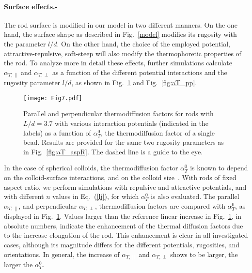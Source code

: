 \documentclass[aps,pre,twocolumn,showpacs,superscriptaddress]{revtex4-1}
\begin{document}
\paragraph{Surface  effects.-}
The rod surface is modified in our model in two different manners. On
the one hand, the surface shape as described in Fig.~\ref{model}
modifies its rugosity with the parameter $l/d$. On the other
hand, the choice of the employed potential, attractive-repulsive,
soft-steep will also modify the thermophoretic properties of the
rod. %
To analyze more in detail these effects, further simulations calculate
$\alpha_{T,\|}$ and $\alpha_{T,\perp}$ as a function of the different
potential interactions and the rugosity parameter $l/d$, as shown in
Fig.~\ref{fig:app_a0} and Fig.~\ref{fig:aT_pp}. %
\begin{figure}[h!]
\texttt{[image: Fig7.pdf]}
\caption{\label{fig:app_a0} Parallel and perpendicular thermodiffusion
  factors for rods with $L/d=3.7$ with various interaction potentials
  (indicated in the labels) as a function of $\alpha_T^0$, the
  thermodiffusion factor of a single bead. Results are provided for
  the same two rugosity parameters as in Fig.~\ref{fig:aT_aspR}. The
  dashed line is a guide to the eye.}
\end{figure} 
In the case of spherical colloids, the thermodiffusion factor
$\alpha_T^0$ is known to depend on the colloid-surface interactions,
and on the colloid size~\cite{piazza08r,luese12jpcm}. With rods of
fixed aspect ratio, we perform simulations with repulsive and
attractive potentials, and with different $n$ values in
Eq.~(\ref{lj}), for which $\alpha_T^0$ is also evaluated. The parallel
$\alpha_{T,\|}$, and perpendicular $\alpha_{T,\perp}$, thermodiffusion
factors are compared with $\alpha_T^0$, as displayed in
Fig.~\ref{fig:app_a0}. %
Values larger than the reference linear increase in
Fig.~\ref{fig:app_a0}, in absolute numbers, indicate the enhancement
of the thermal diffusion factors due to the increase elongation of the
rod. This enhancement is clear in all investigated cases, although its
magnitude differs for the different potentials, rugosities, and
orientations. In general, the increase of $\alpha_{T,\|}$ and
$\alpha_{T,\perp}$ shows to be larger, the larger the $\alpha_T^0$. %
\end{document}
